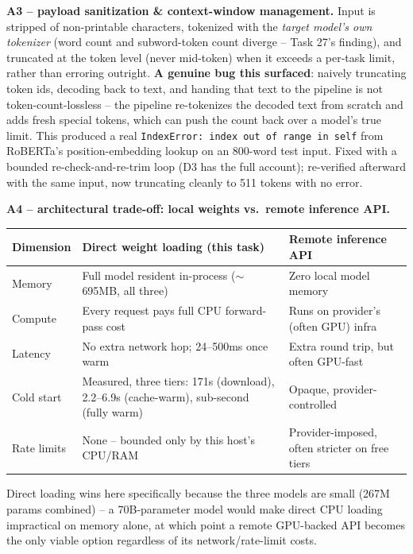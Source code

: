 \documentclass[11pt,a4paper]{article}
\begin{document}
\textbf{A3 -- payload sanitization \& context-window management.} Input is stripped of
non-printable characters, tokenized with the \emph{target model's own tokenizer} (word count
and subword-token count diverge -- Task 27's finding), and truncated at the token level (never
mid-token) when it exceeds a per-task limit, rather than erroring outright. \textbf{A genuine
bug this surfaced}: naively truncating token ids, decoding back to text, and handing that text
to the pipeline is not token-count-lossless -- the pipeline re-tokenizes the decoded text from
scratch and adds fresh special tokens, which can push the count back over a model's true limit.
This produced a real \texttt{IndexError: index out of range in self} from RoBERTa's
position-embedding lookup on an 800-word test input. Fixed with a bounded re-check-and-re-trim
loop (D3 has the full account); re-verified afterward with the same input, now truncating
cleanly to 511 tokens with no error.

\textbf{A4 -- architectural trade-off: local weights vs.\ remote inference API.}

\begin{table}[H]
\centering
\small
\begin{tabular}{lp{5.6cm}p{5.6cm}}
\toprule
\textbf{Dimension} & \textbf{Direct weight loading (this task)} & \textbf{Remote inference API} \\
\midrule
Memory & Full model resident in-process ($\sim$695MB, all three) & Zero local model memory \\
Compute & Every request pays full CPU forward-pass cost & Runs on provider's (often GPU) infra \\
Latency & No extra network hop; 24--500ms once warm & Extra round trip, but often GPU-fast \\
Cold start & Measured, three tiers: 171s (download), 2.2--6.9s (cache-warm), sub-second (fully warm) & Opaque, provider-controlled \\
Rate limits & None -- bounded only by this host's CPU/RAM & Provider-imposed, often stricter on free tiers \\
\bottomrule
\end{tabular}
\end{table}

Direct loading wins here specifically because the three models are small (267M params
combined) -- a 70B-parameter model would make direct CPU loading impractical on memory alone,
at which point a remote GPU-backed API becomes the only viable option regardless of its
network/rate-limit costs.
\end{document}
